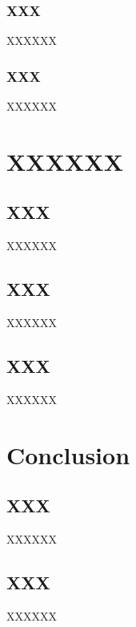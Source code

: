 \documentclass[12pt]{article}
\begin{document}
\begin{CJK*}{UTF8}{bsmi}
\par

\subsubsection{XXX}
XXXXXX



\subsubsection{XXX}
XXXXXX




\newpage
\section{XXXXXX}
\subsection{XXX}

XXXXXX


\subsection{XXX}
XXXXXX


\subsection{XXX}
XXXXXX



\newpage

\section{Conclusion}
\subsection{XXX}
XXXXXX



\subsection{XXX}
XXXXXX



\newpage











\end{CJK*}
\end{document}
